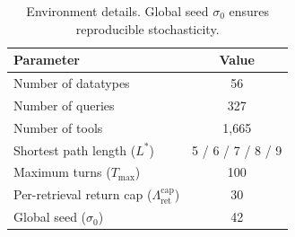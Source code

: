 \documentclass{llmxive}
\begin{document}
\begin{table}[t]
\begin{center}
\small
\begin{tabular}{lc}
\toprule
\textbf{Parameter} & \textbf{Value} \\
\midrule
Number of datatypes & 56 \\
Number of queries & 327 \\
Number of tools & 1,665 \\
Shortest path length ($L^*$) & 5 / 6 / 7 / 8 / 9 \\
Maximum turns ($T_{\max}$) & 100 \\
Per-retrieval return cap ($\Lambda_{\mathrm{ret}}^{\mathrm{cap}}$) & 30  \\
Global seed ($\sigma_0$) & 42 \\
\bottomrule
\end{tabular}
\end{center}
\vspace{-0.13in}
\caption{Environment details. Global seed $\sigma_0$ ensures reproducible stochasticity.}
\label{tab:default_env_settings}
\vspace{-0.25in}
\end{table}
\end{document}
